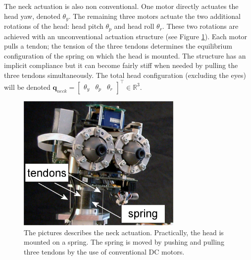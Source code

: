 The neck actuation is also non conventional. One motor directly actuates the head yaw, denoted $\theta_y$. The remaining three motors actuate the two additional rotations of the head: head pitch $\theta_p$ and head roll $\theta_r$. These two rotations are achieved with an unconventional actuation structure (see Figure \ref{Fig:Head}). Each motor pulls a tendon; the tension of the three tendons determines the equilibrium configuration of the spring on which the head is mounted. The structure has an implicit compliance but it can become fairly stiff when needed by pulling the three tendons simultaneously. The total head configuration (excluding the eyes) will be denoted $\mathbf q_{neck} = \begin{bmatrix} \theta_y & \theta_p & \theta_r \end{bmatrix}^\top \in \mathbb R^3$.

\begin{figure}[tbp]
\centering
\includegraphics[width=80mm]{Figure/Head.jpg}
\caption{The pictures describes the neck actuation. Practically, the head is mounted on a spring. The spring is moved by pushing and pulling three tendons by the use of conventional DC motors.}
\label{Fig:Head}
\end{figure}

